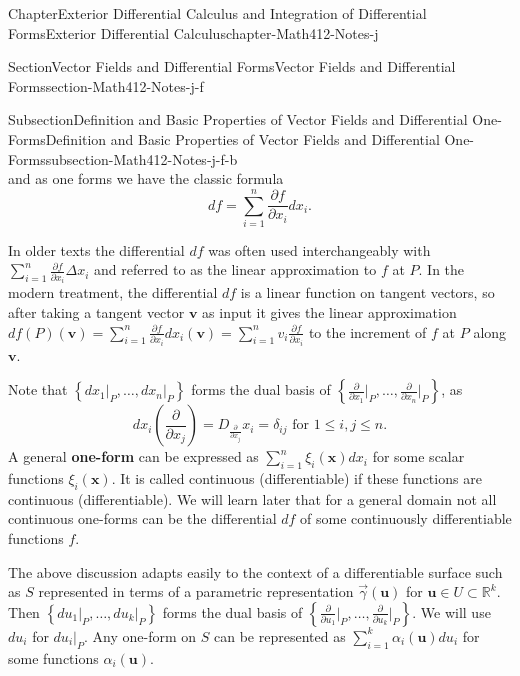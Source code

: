\documentclass[oneside,10pt,]{book}
\newcommand{\terminology}[1]{\textbf{#1}}
\numberwithin{equation}{section}
\newcommand{\bu}{\mathbf{u}}
\newcommand{\bx}{\mathbf{x}}
\newcommand{\bbR}{\mathbb{R}}
\newcommand{\vg}{{\vec{\gamma}}}
\begin{document}
\begin{chapterptx}{Chapter}{Exterior Differential Calculus and Integration of Differential Forms}{}{Exterior Differential Calculus}{}{}{chapter-Math412-Notes-j}
\begin{sectionptx}{Section}{Vector Fields and Differential Forms}{}{Vector Fields and Differential Forms}{}{}{section-Math412-Notes-j-f}
\begin{subsectionptx}{Subsection}{Definition and Basic Properties of Vector Fields and Differential One-Forms}{}{Definition and Basic Properties of Vector Fields and Differential One-Forms}{}{}{subsection-Math412-Notes-j-f-b}
\begin{equation*}
\end{equation*}
and as one forms we have the classic formula%
\begin{equation}
df=\sum_{i=1}^{n}\frac{\partial f}{\partial x_{i}} dx_{i}.\label{men-eq-differential}
\end{equation}
%
\par
In older texts the differential \(df\) was often used interchangeably	with \(\sum_{i=1}^{n}\frac{\partial f}{\partial x_{i}} \Delta x_{i}\) and referred to as the linear approximation to \(f\) at \(P\). In the modern treatment, the differential \(df\) is a linear function on tangent vectors, so after taking a tangent vector \(\mathbf v\) as input it gives the linear approximation \(df(P)({\mathbf v})=\sum_{i=1}^{n}\frac{\partial f}{\partial x_{i}} dx_{i}({\mathbf v})
=\sum_{i=1}^{n}v_{i} \frac{\partial f}{\partial x_{i}}\) to the increment of \(f\) at \(P\) along \(\mathbf v\).%
\par
Note that \(\left\{ dx_{1}\Big|_P, \ldots, dx_{n}\Big|_P\right\}\) forms the dual basis of \(\left\{  \frac{\partial }{\partial x_{1}}\Big|_P, \ldots,  \frac{\partial }{\partial x_{n}}\Big|_P\right\}\), as%
\begin{equation}
dx_{i}(\frac{\partial }{\partial x_{j}})=D_{\frac{\partial }{\partial x_{j}}}x_{i}=\delta_{ij} \text{ for } 1\le i, j \le n.\label{men-eq-dual}
\end{equation}
A general \terminology{one-form} can be expressed as \(\sum_{i=1}^{n}\xi_{i}(\bx) dx_{i}\) for some scalar functions \(\xi_{i}(\bx)\). It is called continuous (differentiable) if these functions are continuous (differentiable). We will learn later that for a general domain not all continuous one-forms can be the differential \(df\) of some continuously differentiable functions \(f\).%
\par
The above discussion adapts easily to the context of a differentiable surface such as \(S\) represented in terms of a parametric representation \(\vg (\bu)\) for \(\bu \in U\subset \bbR^{k}\). Then \(\left\{ du_{1}\Big|_P, \ldots, du_{k}\Big|_P\right\}\) forms the dual basis of \(\left\{  \frac{\partial }{\partial u_{1}}\Big|_P, \ldots,  \frac{\partial }{\partial u_{k}}\Big|_P\right\}\). We will use \(du_{i}\) for \(du_{i}\Big|_P\). Any one-form on \(S\) can be represented as \(\sum_{i=1}^{k} \alpha_{i}(\bu) du_{i}\) for some functions \(\alpha_{i}(\bu)\).%
\par

\end{subsectionptx}
\end{sectionptx}
\end{chapterptx}
\end{document}
